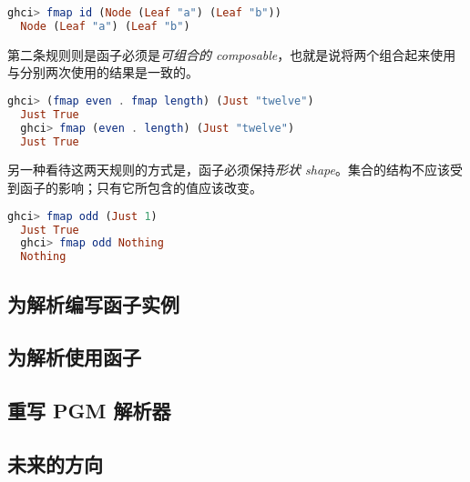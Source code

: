\documentclass[./main.tex]{subfiles}
\begin{document}
\begin{lstlisting}[language=Haskell]
  ghci> fmap id (Node (Leaf "a") (Leaf "b"))
  Node (Leaf "a") (Leaf "b")
\end{lstlisting}

第二条规则则是函子必须是\textit{可组合的 composable}，也就是说将两个组合起来使用与分别两次使用的结果是一致的。

\begin{lstlisting}[language=Haskell]
  ghci> (fmap even . fmap length) (Just "twelve")
  Just True
  ghci> fmap (even . length) (Just "twelve")
  Just True
\end{lstlisting}

另一种看待这两天规则的方式是，函子必须保持\textit{形状 shape}。集合的结构不应该受到函子的影响；只有它所包含的值应该改变。

\begin{lstlisting}[language=Haskell]
  ghci> fmap odd (Just 1)
  Just True
  ghci> fmap odd Nothing
  Nothing
\end{lstlisting}

\subsection*{为解析编写函子实例}

\subsection*{为解析使用函子}

\subsection*{重写 PGM 解析器}

\subsection*{未来的方向}
\end{document}

